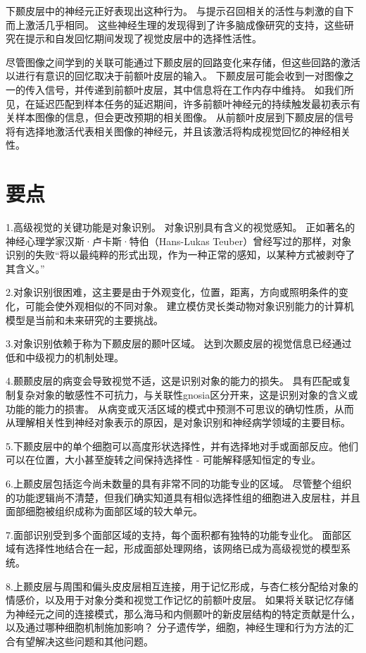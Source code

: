 下颞皮层中的神经元正好表现出这种行为。
与提示召回相关的活性与刺激的自下而上激活几乎相同。 
这些神经生理的发现得到了许多脑成像研究的支持，这些研究在提示和自发回忆期间发现了视觉皮层中的选择性活性。


尽管图像之间学到的关联可能通过下颞皮层的回路变化来存储，但这些回路的激活以进行有意识的回忆取决于前额叶皮层的输入。
下颞皮层可能会收到一对图像之一的传入信号，并传递到前额叶皮层，其中信息将在工作内存中维持。
如我们所见，在延迟匹配到样本任务的延迟期间，许多前额叶神经元的持续触发最初表示有关样本图像的信息，但会更改预期的相关图像。
从前额叶皮层到下颞皮层的信号将有选择地激活代表相关图像的神经元，并且该激活将构成视觉回忆的神经相关性。



\section{要点}

1.高级视觉的关键功能是对象识别。
对象识别具有含义的视觉感知。
正如著名的神经心理学家汉斯·卢卡斯·特伯（Hans-Lukas Teuber）曾经写过的那样，对象识别的失败“将以最纯粹的形式出现，作为一种正常的感知，以某种方式被剥夺了其含义。” 


2.对象识别很困难，这主要是由于外观变化，位置，距离，方向或照明条件的变化，可能会使外观相似的不同对象。
建立模仿灵长类动物对象识别能力的计算机模型是当前和未来研究的主要挑战。


3.对象识别依赖于称为下颞皮层的颞叶区域。
达到次颞皮层的视觉信息已经通过低和中级视力的机制处理。


4.颞颞皮层的病变会导致视觉不适，这是识别对象的能力的损失。
具有匹配或复制复杂对象的敏感性不可抗力，与关联性gnosia区分开来，这是识别对象的含义或功能的能力的损害。
从病变或灭活区域的模式中预测不可思议的确切性质，从而从理解相关性到神经对象表示的原因，是对象识别和神经病学领域的主要目标。 


5.下颞皮层中的单个细胞可以高度形状选择性，并有选择地对手或面部反应。他们可以在位置，大小甚至旋转之间保持选择性 - 可能解释感知恒定的专业。


6.上颞皮层包括迄今尚未数量的具有非常不同的功能专业的区域。
尽管整个组织的功能逻辑尚不清楚，但我们确实知道具有相似选择性组的细胞进入皮层柱，并且面部细胞被组织成称为面部区域的较大单元。 


7.面部识别受到多个面部区域的支持，每个面积都有独特的功能专业化。
面部区域有选择性地结合在一起，形成面部处理网络，该网络已成为高级视觉的模型系统。


8.上颞皮层与周围和偏头皮皮层相互连接，用于记忆形成，与杏仁核分配给对象的情感价，以及用于对象分类和视觉工作记忆的前额叶皮层。
如果将关联记忆存储为神经元之间的连接模式，那么海马和内侧颞叶的新皮层结构的特定贡献是什么，以及通过哪种细胞机制施加影响？
分子遗传学，细胞，神经生理和行为方法的汇合有望解决这些问题和其他问题。


